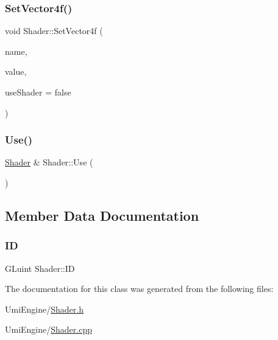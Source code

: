 \mbox{\label{class_shader_a2d24719a9edc9541bd01cf230f0b3a12}} 
\subsubsection{\texorpdfstring{SetVector4f()}{SetVector4f()}\hspace{0.1cm}{\footnotesize\ttfamily [2/2]}}
{\footnotesize\ttfamily void Shader\+::\+Set\+Vector4f (\begin{DoxyParamCaption}\item[{const G\+Lchar $\ast$}]{name,  }\item[{const glm\+::vec4 \&}]{value,  }\item[{G\+Lboolean}]{use\+Shader = {\ttfamily false} }\end{DoxyParamCaption})}

\mbox{\label{class_shader_a02292f4fdae284b29169db5da29e519a}} 
\subsubsection{\texorpdfstring{Use()}{Use()}}
{\footnotesize\ttfamily \mbox{\hyperlink{class_shader}{Shader}} \& Shader\+::\+Use (\begin{DoxyParamCaption}{ }\end{DoxyParamCaption})}



\subsection{Member Data Documentation}
\mbox{\label{class_shader_a7be2afcbd5ba5873a04536a2b4b5e576}} 
\subsubsection{\texorpdfstring{ID}{ID}}
{\footnotesize\ttfamily G\+Luint Shader\+::\+ID}



The documentation for this class was generated from the following files\+:\begin{DoxyCompactItemize}
\item 
Umi\+Engine/\mbox{\hyperlink{_shader_8h}{Shader.\+h}}\item 
Umi\+Engine/\mbox{\hyperlink{_shader_8cpp}{Shader.\+cpp}}\end{DoxyCompactItemize}
